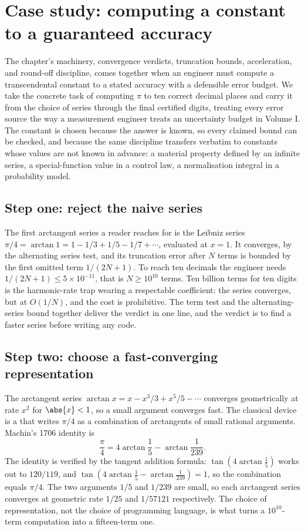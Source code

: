 \section{Case study: computing a constant to a guaranteed accuracy}

The chapter's machinery, convergence verdicts, truncation bounds,
acceleration, and round-off discipline, comes together when an engineer
must compute a transcendental constant to a stated accuracy with a
defensible error budget. We take the concrete task of computing $\pi$ to
ten correct decimal places and carry it from the choice of series
through the final certified digits, treating every error source the way
a measurement engineer treats an uncertainty budget in Volume I. The
constant is chosen because the answer is known, so every claimed bound
can be checked, and because the same discipline transfers verbatim to
constants whose values are not known in advance: a material property
defined by an infinite series, a special-function value in a control
law, a normalisation integral in a probability model.

\subsection{Step one: reject the naive series}

The first arctangent series a reader reaches for is the Leibniz series
$\pi/4 = \arctan 1 = 1 - 1/3 + 1/5 - 1/7 + \cdots$, evaluated at $x =
1$. It converges, by the alternating series test, and its truncation
error after $N$ terms is bounded by the first omitted term $1/(2N+1)$.
To reach ten decimals the engineer needs $1/(2N+1) \leq 5 \times
10^{-11}$, that is $N \geq 10^{10}$ terms. Ten billion terms for ten
digits is the harmonic-rate trap wearing a respectable coefficient: the
series converges, but at $O(1/N)$, and the cost is prohibitive. The
term test and the alternating-series bound together deliver the verdict
in one line, and the verdict is to find a faster series before writing
any code.

\subsection{Step two: choose a fast-converging representation}

The arctangent series $\arctan x = x - x^{3}/3 + x^{5}/5 - \cdots$
converges geometrically at rate $x^{2}$ for $\abs{x} < 1$, so a small
argument converges fast. The classical device is a  that writes $\pi/4$ as a combination of arctangents of small
rational arguments. Machin's 1706 identity is
\[
\frac{\pi}{4} = 4 \arctan\frac{1}{5} - \arctan\frac{1}{239}.
\]
The identity is verified by the tangent addition formula: $\tan(4
\arctan\tfrac{1}{5})$ works out to $120/119$, and $\tan(4
\arctan\tfrac{1}{5} - \arctan\tfrac{1}{239}) = 1$, so the combination
equals $\pi/4$. The two arguments $1/5$ and $1/239$ are small, so each
arctangent series converges at geometric rate $1/25$ and $1/57121$
respectively. The choice of representation, not the choice of
programming language, is what turns a $10^{10}$-term computation into a
fifteen-term one.

